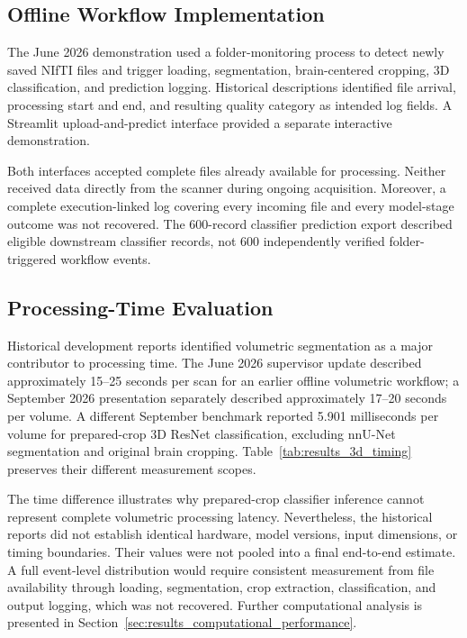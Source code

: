 \subsection{Offline Workflow Implementation}
\label{subsec:results_3d_offline_simulation}

The June 2026 demonstration used a folder-monitoring process to detect newly saved NIfTI files and trigger loading, segmentation, brain-centered cropping, 3D classification, and prediction logging. Historical descriptions identified file arrival, processing start and end, and resulting quality category as intended log fields. A Streamlit upload-and-predict interface provided a separate interactive demonstration.

Both interfaces accepted complete files already available for processing. Neither received data directly from the scanner during ongoing acquisition. Moreover, a complete execution-linked log covering every incoming file and every model-stage outcome was not recovered. The 600-record classifier prediction export described eligible downstream classifier records, not 600 independently verified folder-triggered workflow events.

\subsection{Processing-Time Evaluation}
\label{subsec:results_3d_workflow_timing}

Historical development reports identified volumetric segmentation as a major contributor to processing time. The June 2026 supervisor update described approximately 15--25 seconds per scan for an earlier offline volumetric workflow; a September 2026 presentation separately described approximately 17--20 seconds per volume. A different September benchmark reported 5.901 milliseconds per volume for prepared-crop 3D ResNet classification, excluding nnU-Net segmentation and original brain cropping. Table~\ref{tab:results_3d_timing} preserves their different measurement scopes.

The time difference illustrates why prepared-crop classifier inference cannot represent complete volumetric processing latency. Nevertheless, the historical reports did not establish identical hardware, model versions, input dimensions, or timing boundaries. Their values were not pooled into a final end-to-end estimate. A full event-level distribution would require consistent measurement from file availability through loading, segmentation, crop extraction, classification, and output logging, which was not recovered. Further computational analysis is presented in Section~\ref{sec:results_computational_performance}.

